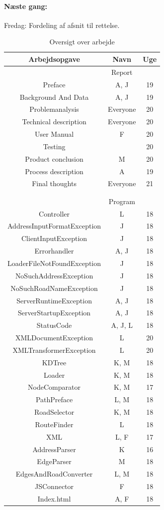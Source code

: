 \documentclass[a4paper,10pt,titlepage]{article}
\begin{document}
		\paragraph{N\ae ste gang:}
		Fredag: Fordeling af afsnit til rettelse.\\ 

\begin{table}
\caption{Oversigt over arbejde}
\centering
\begin{tabular}{c c c}
Arbejdsopgave & Navn & Uge \\ [1.5ex] 
\hline
   & Report &  \\
Preface & A, J & 19 \\
Background And Data & A, J & 19 \\
Problemanalysis & Everyone & 20\\
Technical description & Everyone & 20 \\
User Manual & F & 20 \\
Testing &  & 20 \\
Product conclusion & M & 20\\
Process description & A & 19\\
Final thoughts & Everyone & 21\\
\\
\\
  & Program &  \\
Controller & L & 18 \\
AddressInputFormatException & J & 18 \\
ClientInputException & J & 18 \\
Errorhandler & A, J & 18 \\
LoaderFileNotFoundException & J & 18 \\
NoSuchAddressException & J & 18 \\
NoSuchRoadNameException & J & 18 \\
ServerRuntimeException & A, J & 18 \\
ServerStartupException & A, J & 18 \\
StatusCode & A, J, L & 18 \\
XMLDocumentException & L & 20 \\
XMLTransformerException & L & 20 \\
KDTree & K, M & 18 \\
Loader & K, M & 18 \\
NodeComparator & K, M & 17 \\
PathPreface & L, M & 18 \\
RoadSelector & K, M & 18 \\
RouteFinder & L & 18 \\
XML	& L, F & 17 \\
AddressParser & K & 16 \\
EdgeParser & M & 18 \\
EdgesAndRoadConverter & L, M & 18 \\
JSConnector & F & 18 \\
Index.html & A, F & 18 \\

\end{tabular}
\end{table}
\end{document}
